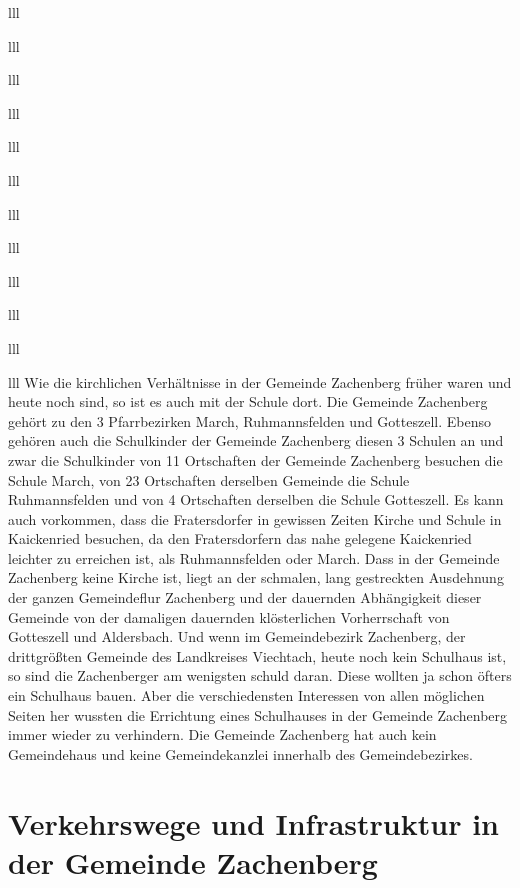 \documentclass[12pt,a4pager]{book}
\begin{document}
\begin{tabuluar}{lll}
\begin{tabuluar}{lll}
\begin{tabuluar}{lll}
\begin{tabuluar}{lll}
\begin{tabuluar}{lll}
\begin{tabuluar}{lll}
\begin{tabuluar}{lll}
\begin{tabuluar}{lll}
\begin{tabuluar}{lll}
\begin{tabuluar}{lll}
\begin{tabuluar}{lll}
\begin{tabuluar}{lll}
Wie die kirchlichen Verhältnisse in der Gemeinde Zachenberg früher waren und
heute noch sind, so ist es auch mit der Schule dort. Die Gemeinde Zachenberg
gehört zu den 3 Pfarrbezirken March, Ruhmannsfelden und Gotteszell. Ebenso
gehören auch die Schulkinder der Gemeinde Zachenberg diesen 3 Schulen an und
zwar die Schulkinder von 11 Ortschaften der Gemeinde Zachenberg besuchen die
Schule March, von 23 Ortschaften derselben Gemeinde die Schule Ruhmannsfelden
und von 4 Ortschaften derselben die Schule Gotteszell. Es kann auch vorkommen,
dass die Fratersdorfer in gewissen Zeiten Kirche und Schule in Kaickenried
besuchen, da den Fratersdorfern das nahe gelegene Kaickenried leichter zu
erreichen ist, als Ruhmannsfelden oder March. Dass in der Gemeinde Zachenberg
keine Kirche ist, liegt an der schmalen, lang gestreckten Ausdehnung der ganzen
Gemeindeflur Zachenberg und der dauernden Abhängigkeit dieser Gemeinde von der
damaligen dauernden klösterlichen Vorherrschaft von Gotteszell und Aldersbach.
Und wenn im Gemeindebezirk Zachenberg, der drittgrößten Gemeinde des Landkreises
Viechtach, heute noch kein Schulhaus ist, so sind die Zachenberger am wenigsten
schuld daran. Diese wollten ja schon öfters ein Schulhaus bauen. Aber die
verschiedensten Interessen von allen möglichen Seiten her wussten die Errichtung
eines Schulhauses in der Gemeinde Zachenberg immer wieder zu verhindern. Die
Gemeinde Zachenberg hat auch kein Gemeindehaus und keine Gemeindekanzlei
innerhalb des Gemeindebezirkes.

\section{Verkehrswege und Infrastruktur in der Gemeinde Zachenberg}


\end{tabuluar}
\end{tabuluar}
\end{tabuluar}
\end{tabuluar}
\end{tabuluar}
\end{tabuluar}
\end{tabuluar}
\end{tabuluar}
\end{tabuluar}
\end{tabuluar}
\end{tabuluar}
\end{tabuluar}
\end{document}
